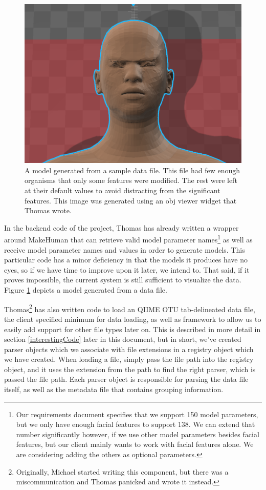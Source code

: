 \documentclass[letterpaper,10pt, onecolumn]{IEEEtran}
\begin{document}
\begin{figure}
	\includegraphics{Generated}
	\caption{A model generated from a sample data file. This file had few enough organisms that only some features were modified. The rest were left at their default values to avoid distracting from the significant features. This image was generated using an obj viewer widget that Thomas wrote.}
	\label{fig:generated}
\end{figure}

In the backend code of the project, Thomas has already written a wrapper around MakeHuman that can retrieve valid model parameter names\footnote{Our requirements document specifies that we support 150 model parameters, but we only have enough facial features to support 138. We can extend that number significantly however, if we use other model parameters besides facial features, but our client mainly wants to work with facial features alone. We are considering adding the others as optional parameters.} as well as receive model parameter names and values in order to generate models. This particular code has a minor deficiency in that the models it produces have no eyes, so if we have time to improve upon it later, we intend to. That said, if it proves impossible, the current system is still sufficient to visualize the data. Figure \ref{fig:generated} depicts a model generated from a data file.

Thomas\footnote{Originally, Michael started writing this component, but there was a miscommunication and Thomas panicked and wrote it instead.} has also written code to load an QIIME OTU tab-delineated data file, the client specified minimum for data loading, as well as framework to allow us to easily add support for other file types later on. This is described in more detail in section \ref{interestingCode} later in this document, but in short, we've created parser objects which we associate with file extensions in a registry object which we have created. When loading a file, simply pass the file path into the registry object, and it uses the extension from the path to find the right parser, which is passed the file path. Each parser object is responsible for parsing the data file itself, as well as the metadata file that contains grouping information.
\end{document}
